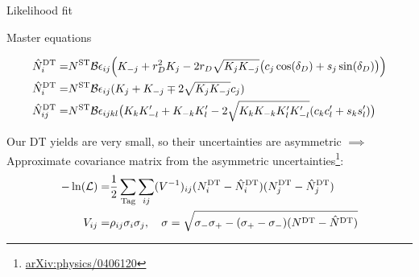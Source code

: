 \documentclass{beamer}
\begin{document}
\begin{frame}{Likelihood fit}
  \begin{block}{Master equations}
    \begin{center}
      \vspace{-0.5cm}
      \begin{align*}
        \hat{N}^{\rm DT}_i =& N^{\rm ST}\mathcal{B}\epsilon_{ij}\Big(K_{-j} + r_D^2K_j - 2r_D\sqrt{K_jK_{-j}}\big(c_j\cos(\delta_D) + s_j\sin(\delta_D)\big)\Big) \\
        \hat{N}^{\rm DT}_i =& N^{\rm ST}\mathcal{B}\epsilon_{ij}(K_j + K_{-j} \mp 2\sqrt{K_jK_{-j}}c_j) \\
        \hat{N}^{\rm DT}_{ij} =& N^{\rm ST}\mathcal{B}\epsilon_{ijkl}\big(K_{k}K_{-l}^\prime + K_{-k}K_{l}^\prime - 2\sqrt{K_{k}K_{-k}K_{l}^\prime K_{-l}^\prime}(c_{k}c_{l}^\prime + s_{k}s_{l}^\prime)\big)
      \end{align*}
    \end{center}
  \end{block}
  \vspace{0.5cm}
  \begin{center}
    Our DT yields are very small, so their uncertainties are asymmetric $\implies$\\
    Approximate covariance matrix from the asymmetric uncertainties\footnote{\href{https://arxiv.org/abs/physics/0406120}{arXiv:physics/0406120}}:
    \begin{align*}
      -\ln(\mathcal{L}) =& \frac{1}{2}\sum_{\rm Tag}\sum_{ij}(V^{-1})_{ij}(N^{\rm DT}_i - \hat{N}^{\rm DT}_i)(N^{\rm DT}_j - \hat{N}^{\rm DT}_j) \\
      V_{ij} =& \rho_{ij}\sigma_i\sigma_j, \quad \sigma = \sqrt{\sigma_-\sigma_+ - (\sigma_+ - \sigma_-)(N^{\rm DT} - \hat{N}^{\rm DT})}
    \end{align*}
  \end{center}
\end{frame}
\end{document}
